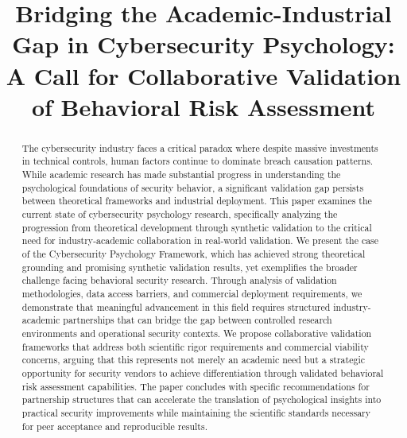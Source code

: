\documentclass[10pt,twocolumn]{IEEEtran}
\begin{document}
\title{Bridging the Academic-Industrial Gap in Cybersecurity Psychology:\\
A Call for Collaborative Validation of Behavioral Risk Assessment}

\author{
}

\maketitle

\begin{abstract}
The cybersecurity industry faces a critical paradox where despite massive investments in technical controls, human factors continue to dominate breach causation patterns. While academic research has made substantial progress in understanding the psychological foundations of security behavior, a significant validation gap persists between theoretical frameworks and industrial deployment. This paper examines the current state of cybersecurity psychology research, specifically analyzing the progression from theoretical development through synthetic validation to the critical need for industry-academic collaboration in real-world validation. We present the case of the Cybersecurity Psychology Framework, which has achieved strong theoretical grounding and promising synthetic validation results, yet exemplifies the broader challenge facing behavioral security research. Through analysis of validation methodologies, data access barriers, and commercial deployment requirements, we demonstrate that meaningful advancement in this field requires structured industry-academic partnerships that can bridge the gap between controlled research environments and operational security contexts. We propose collaborative validation frameworks that address both scientific rigor requirements and commercial viability concerns, arguing that this represents not merely an academic need but a strategic opportunity for security vendors to achieve differentiation through validated behavioral risk assessment capabilities. The paper concludes with specific recommendations for partnership structures that can accelerate the translation of psychological insights into practical security improvements while maintaining the scientific standards necessary for peer acceptance and reproducible results.
\end{abstract}
\end{document}
